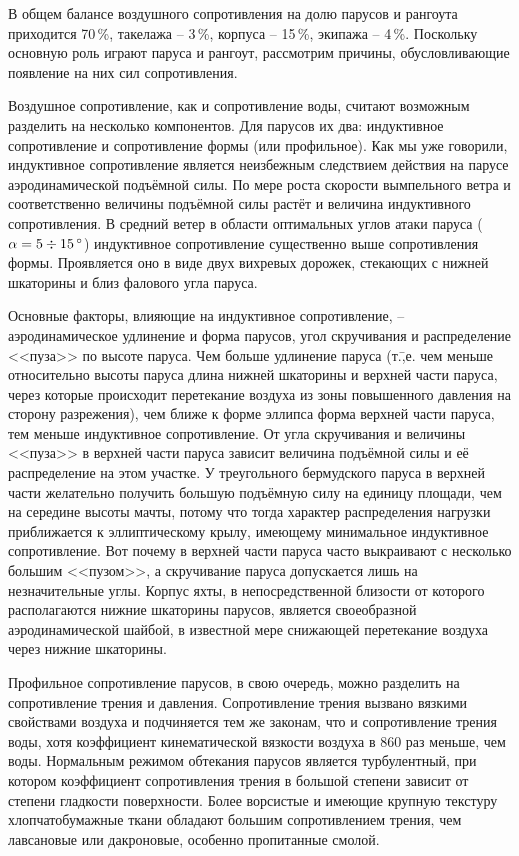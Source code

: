 В общем балансе воздушного сопротивления на долю парусов и рангоута приходится 70\,\%, такелажа \--- 3\,\%, корпуса \--- 15\,\%, экипажа \--- 4\,\%. Поскольку основную роль играют паруса и рангоут, рассмотрим причины, обусловливающие появление на них сил сопротивления.

Воздушное сопротивление, как и сопротивление воды, считают возможным разделить на несколько компонентов. Для парусов их два: индуктивное сопротивление и сопротивление формы (или профильное). Как мы уже говорили, индуктивное сопротивление является неизбежным следствием действия на парусе аэродинамической подъёмной силы. По мере роста скорости вымпельного ветра и соответственно величины подъёмной силы растёт и величина индуктивного сопротивления. В средний ветер в области оптимальных углов атаки паруса ($\alpha = 5\div 15\,^\circ$) индуктивное сопротивление существенно выше сопротивления формы. Проявляется оно в виде двух вихревых дорожек, стекающих с нижней шкаторины и близ фалового угла паруса.
 
Основные факторы, влияющие на индуктивное сопротивление, \--- аэродинамическое удлинение и форма парусов, угол скручивания и распределение <<пуза>> по высоте паруса. Чем больше удлинение паруса (т.\=,е. чем меньше относительно высоты паруса длина нижней шкаторины и верхней части паруса, через которые происходит перетекание воздуха из зоны повышенного давления на сторону разрежения), чем ближе к форме эллипса форма верхней части паруса, тем меньше индуктивное сопротивление. От угла скручивания и величины <<пуза>> в верхней части паруса зависит величина подъёмной силы и её распределение на этом участке. У треугольного бермудского паруса в верхней части желательно получить большую подъёмную силу на единицу площади, чем на середине высоты мачты, потому что тогда характер распределения нагрузки приближается к эллиптическому крылу, имеющему минимальное индуктивное сопротивление. Вот почему в верхней части паруса часто выкраивают с несколько большим <<пузом>>, а скручивание паруса допускается лишь на незначительные углы. Корпус яхты, в непосредственной близости от которого располагаются нижние шкаторины парусов, является своеобразной аэродинамической шайбой, в известной мере снижающей перетекание воздуха через нижние шкаторины. 

Профильное сопротивление парусов, в свою очередь, можно разделить на сопротивление трения и давления. Сопротивление трения вызвано вязкими свойствами воздуха и подчиняется тем же законам, что и сопротивление трения воды, хотя коэффициент кинематической вязкости воздуха в 860 раз меньше, чем воды. Нормальным режимом обтекания парусов является турбулентный, при котором коэффициент сопротивления трения в большой степени зависит от степени гладкости поверхности. Более ворсистые и имеющие крупную текстуру хлопчатобумажные ткани обладают большим сопротивлением трения, чем лавсановые или дакроновые, особенно пропитанные смолой. 

